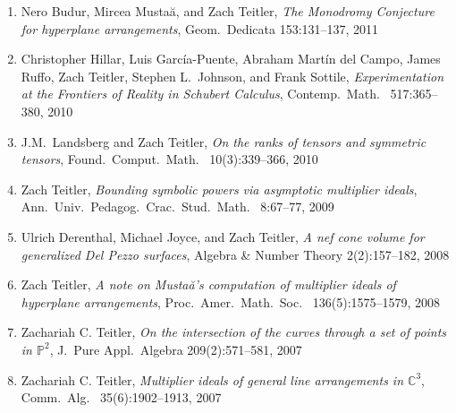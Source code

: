 \documentclass[12pt]{article}
\begin{document}
\begin{enumerate}[1.]
\item
Nero Budur, Mircea Musta\u{a}, and Zach Teitler,
\emph{The Monodromy Conjecture for hyperplane arrangements},
Geom.\ Dedicata
153:131--137, 2011

\item
Christopher Hillar, Luis Garc\'ia-Puente, Abraham Mart\'in del Campo, James Ruffo, Zach Teitler,
Stephen L.\ Johnson, and Frank Sottile,
\emph{Experimentation at the Frontiers of Reality in Schubert Calculus},
Contemp.\ Math.\
517:365--380, 2010

\item J.M.~Landsberg and Zach Teitler,
\emph{On the ranks of tensors and symmetric tensors},
Found.\ Comput.\ Math.\
10(3):339--366, 2010

\item Zach Teitler,
\emph{Bounding symbolic powers via asymptotic multiplier ideals},
Ann.\ Univ.\ Pedagog.\ Crac.\ Stud.\ Math.\
8:67--77, 2009

\item Ulrich Derenthal, Michael Joyce, and Zach Teitler,
\emph{A nef cone volume for generalized Del Pezzo surfaces},
Algebra \& Number Theory
2(2):157--182, 2008

\item Zach Teitler,
\emph{A note on Musta\u{a}'s computation of multiplier ideals of hyperplane arrangements},
Proc.\ Amer.\ Math.\ Soc.\
136(5):1575--1579, 2008

\item Zachariah C. Teitler,
\emph{On the intersection of the curves through a set of points in $\mathbb{P}^2$},
J.\ Pure Appl.\ Algebra
209(2):571--581, 2007

\item Zachariah C. Teitler,
\emph{Multiplier ideals of general line arrangements in $\mathbb{C}^3$},
Comm.\ Alg.\
35(6):1902--1913, 2007

\end{enumerate}


%
%
\end{document}
